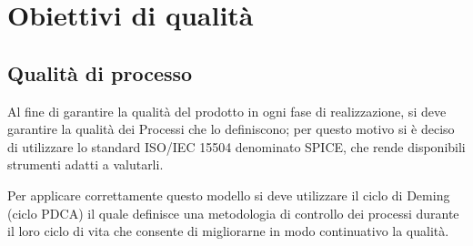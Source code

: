 \section{Obiettivi di qualità} 
\subsection{Qualità di processo}

Al fine di garantire la qualità del prodotto in ogni fase di realizzazione, si deve garantire la qualità dei Processi che lo definiscono; per questo motivo si è deciso di utilizzare lo standard ISO/IEC 15504 denominato SPICE, che rende disponibili strumenti adatti a valutarli.

Per applicare correttamente questo modello si deve utilizzare il ciclo di Deming (ciclo PDCA) il quale definisce una metodologia di controllo dei processi durante il loro ciclo di vita che consente di migliorarne in modo continuativo la qualità.

